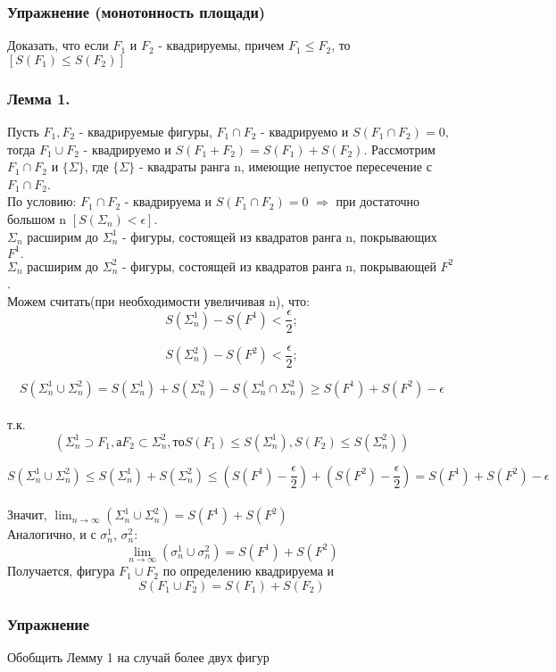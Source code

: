 \subsubsection{Упражнение (монотонность площади)}
Доказать, что если $F_1$ и $F_2$ - квадрируемы, причем $F_1 \leq F_2$, то $[S(F_1) \leq S(F_2)]$

\subsubsection{Лемма 1.}
Пусть $F_1,F_2$ - квадрируемые фигуры, $F_1\cap F_2$ - квадрируемо и $S(F_1 \cap F_2)=0,$ тогда $F_1 \cup F_2$ - квадрируемо и $S(F_1+F_2)=S(F_1)+S(F_2).$
\dokvo
Рассмотрим  $F_1\cap F_2$ и $\{\Sigma\}$, где $\{\Sigma\}$ - квадраты ранга n, имеющие непустое пересечение с $F_1\cap F_2$.
\\
По условию: $F_1\cap F_2$ - квадрируема и $S(F_1\cap F_2)=0$ $\Rightarrow$ при достаточно большом n $[S(\Sigma_n)<\epsilon].$
\\
$\Sigma_n$ расширим до $\Sigma_n^1$ - фигуры, состоящей из квадратов ранга n, покрывающих $F^1.$
\\
$\Sigma_n$ расширим до $\Sigma_n^2$ - фигуры, состоящей из квадратов ранга n, покрывающей $F^2$.
\\
Можем считать(при необходимости увеличивая n), что:
$$
S(\Sigma_n^1)-S(F^1)<\frac{\epsilon}{2};
$$

$$
S(\Sigma_n^2)-S(F^2)<\frac{\epsilon}{2};
$$

$$
S(\Sigma_n^1 \cup \Sigma_n^2)=S(\Sigma_n^1)+S(\Sigma_n^2)-S(\Sigma_n^1 \cap \Sigma_n^2) \geq S(F^1)+S(F^2)-\epsilon
$$
\\
т.к.
$$
(\Sigma_n^1 \supset F_1, а F_2\subset\Sigma_n^2, то S(F_1) \leq S(\Sigma_n^1), S(F_2) \leq S(\Sigma_n^2))
$$

$$
S(\Sigma_n^1 \cup \Sigma_n^2) \leq S(\Sigma_n^1) + S(\Sigma_n^2) \leq (S(F^1)-\frac{\epsilon}{2})+(S(F^2)-\frac{\epsilon}{2})=S(F^1)+S(F^2)-\epsilon
$$
\\
Значит, $\lim_{n \to \infty}(\Sigma_n^1 \cup \Sigma_n^2)=S(F^1)+S(F^2)$
\\
Аналогично, и с $\sigma_n^1$, $\sigma_n^2$:
$$
\lim_{n \to \infty}(\sigma_n^1 \cup \sigma_n^2)=S(F^1)+S(F^2)
$$
Получается, фигура $F_1 \cup F_2$ по определению квадрируема и 
$$
S(F_1 \cup F_2) = S(F_1) + S(F_2)
$$
\dokno

\subsubsection{Упражнение}
Обобщить Лемму 1 на случай более двух фигур

